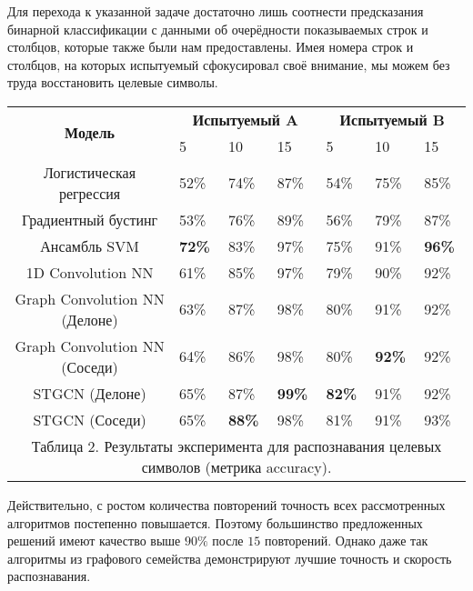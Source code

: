 \documentclass[12pt]{article}
\begin{document}
Для перехода к указанной задаче достаточно лишь соотнести предсказания бинарной классификации с данными об очерёдности показываемых строк и столбцов, которые также были нам предоставлены. Имея номера строк и столбцов, на которых испытуемый сфокусировал своё внимание, мы можем без труда восстановить целевые символы.
    
\begin{center}
\begin{tabular}{ |c|p{1.3cm}p{1.3cm}p{1.3cm}|p{1.3cm}p{1.3cm}p{1.3cm}| } 
                
            \hline
            \multirow{2}{2cm}{\textbf{Модель}} &
            \multicolumn{3}{c|}{\textbf{Испытуемый  A}} & \multicolumn{3}{c|}{\textbf{Испытуемый  B}} \\
            \cline{2-7}
             & 5 & 10 & 15 & 5 & 10 & 15 \\
            \hline
            Логистическая регрессия &  52\% & 74\% &  87\% & 54\% & 75\% & 85\%\\
            Градиентный бустинг & 53\% & 76\% &  89\% & 56\% & 79\% & 87\%\\  
            Ансамбль SVM & \textbf{72\%} & 83\% &  97\% & 75\% & 91\% & \textbf{96\%}\\  
            1D Convolution NN &  61\% & 85\% &  97\% & 79\% & 90\% & 92\%\\
            Graph Convolution NN (Делоне) &  63\% & 87\% &  98\% & 80\% & 91\% & 92\%\\
            Graph Convolution NN (Соседи) &  64\% & 86\% & 98\% & 80\% & \textbf{92\%} & 92\%\\
            STGCN (Делоне) &  65\% & 87\% &  \textbf{99\%} & \textbf{82\%} & 91\% & 92\%\\
            STGCN (Соседи) &  65\% & \textbf{88\%} &  98\% & 81\% & 91\% & 93\%\\
            \hline
            \multicolumn{7}{c}{\footnotesize Таблица 2.
            Результаты эксперимента для распознавания целевых символов (метрика accuracy).} \\
                       
    \end{tabular}
    \end{center}
    
Действительно, с ростом количества повторений точность всех рассмотренных алгоритмов постепенно повышается. Поэтому большинство предложенных решений имеют качество выше $90\%$ после $15$ повторений. Однако даже так алгоритмы из графового семейства демонстрируют лучшие точность и скорость распознавания.
\end{document}
